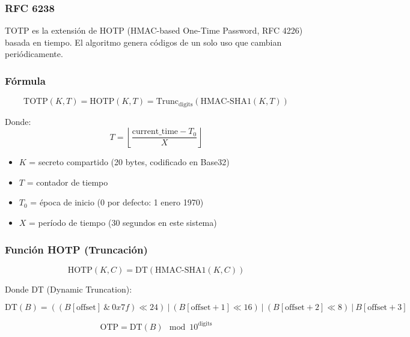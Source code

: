 \documentclass[12pt,a4paper,openany]{article}
\begin{document}
\subsubsection{RFC 6238}

TOTP es la extensión de HOTP (HMAC-based One-Time Password, RFC 4226) basada en tiempo. El algoritmo genera códigos de un solo uso que cambian periódicamente.

\subsubsection{Fórmula}

\begin{equation}
\text{TOTP}(K, T) = \text{HOTP}(K, T) = \text{Trunc}_{\text{digits}}(\text{HMAC-SHA1}(K, T))
\end{equation}

Donde:
\begin{equation}
T = \left\lfloor \frac{\text{current\_time} - T_0}{X} \right\rfloor
\end{equation}

\begin{itemize}
    \item $K$ = secreto compartido (20 bytes, codificado en Base32)
    \item $T$ = contador de tiempo
    \item $T_0$ = época de inicio (0 por defecto: 1 enero 1970)
    \item $X$ = período de tiempo (30 segundos en este sistema)
\end{itemize}

\subsubsection{Función HOTP (Truncación)}

\begin{equation}
\text{HOTP}(K, C) = \text{DT}(\text{HMAC-SHA1}(K, C))
\end{equation}

Donde DT (Dynamic Truncation):

\begin{equation}
\text{DT}(B) = ((B[\text{offset}] \ \& \ 0x7f) \ll 24) \ | \ (B[\text{offset}+1] \ll 16) \ | \ (B[\text{offset}+2] \ll 8) \ | \ B[\text{offset}+3]
\end{equation}

\begin{equation}
\text{OTP} = \text{DT}(B) \mod 10^{\text{digits}}
\end{equation}
\end{document}
